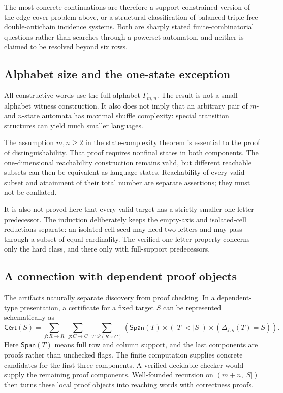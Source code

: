 \documentclass[11pt,letterpaper]{article}
\numberwithin{equation}{section}
\theoremstyle{definition}
\theoremstyle{remark}
\newcommand{\Span}{\mathsf{Span}}
\newcommand{\Cert}{\mathsf{Cert}}
\newcommand{\Pow}{\mathcal{P}}
\begin{document}
The most concrete continuations are therefore a support-constrained version
of the edge-cover problem above, or a structural classification of
balanced-triple-free double-antichain incidence systems. Both are sharply
stated finite-combinatorial questions rather than searches through a
powerset automaton, and neither is claimed to be resolved beyond six rows.

\subsection{Alphabet size and the one-state exception}
All constructive words use the full alphabet $\Gamma_{m,n}$. The result
is not a small-alphabet witness construction. It also does not imply that
an arbitrary pair of $m$- and $n$-state automata has maximal shuffle
complexity: special transition structures can yield much smaller
languages.

The assumption $m,n\ge2$ in the state-complexity theorem is essential to
the proof of distinguishability. That proof requires nonfinal states in
both components. The one-dimensional reachability construction remains
valid, but different reachable subsets can then be equivalent as language
states. Reachability of every valid subset and attainment of their total
number are separate assertions; they must not be conflated.

It is also not proved here that every valid target has a strictly smaller
one-letter predecessor. The induction deliberately keeps the empty-axis and
isolated-cell reductions separate: an isolated-cell seed may need two letters
and may pass through a subset of equal cardinality. The verified one-letter
property concerns only the hard class, and there only with full-support
predecessors.

\subsection{A connection with dependent proof objects}
The artifacts naturally separate discovery from proof checking. In a
dependent-type presentation, a certificate for a fixed target $S$ can be
represented schematically as
\[
 \Cert(S)=
 \sum_{f:R\to R}\ \sum_{g:C\to C}\ \sum_{T:\Pow(R\times C)}
 \left(\Span(T)\times(|T|<|S|)\times
       (\Delta_{f,g}(T)=S)\right).
\]
Here $\Span(T)$ means full row and column support, and the last components
are proofs rather than unchecked flags. The finite computation supplies
concrete candidates for the first three components. A verified decidable
checker would supply the remaining proof components. Well-founded
recursion on $(m+n,|S|)$ then turns these local proof objects into reaching
words with correctness proofs.
\end{document}
